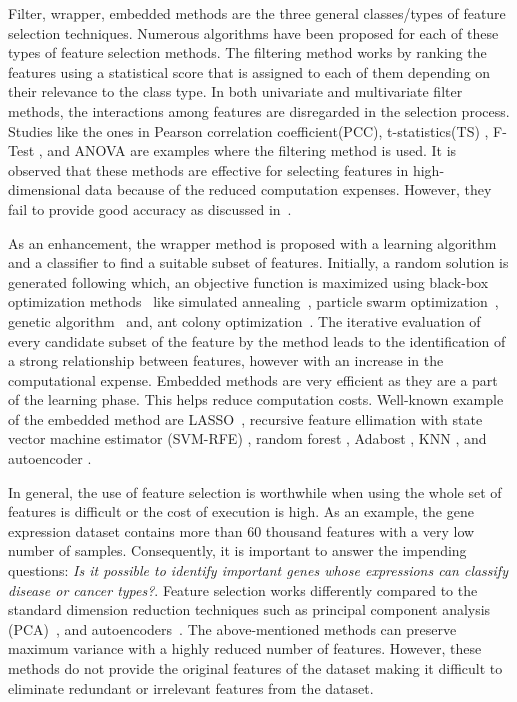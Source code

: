 \documentclass{bioinfo}
\begin{document}
Filter, wrapper, embedded methods are the three general classes/types of feature selection techniques. 
Numerous algorithms have been proposed for each of these types of feature selection methods. 
The filtering method works by ranking the features using a statistical score that is assigned to each of them depending on their relevance to the class type. 
In both univariate and multivariate filter methods, the interactions among features are disregarded in the selection process. 
Studies like the ones in Pearson correlation coefficient(PCC), t-statistics(TS) \citep{speed2003statistical}, F-Test \citep{ding2005minimum}, and ANOVA \citep{ding2015identification} are examples where the filtering method is used. 
It is observed that these methods are effective for selecting features in high-dimensional data because of the reduced computation expenses. 
However, they fail to provide good accuracy as discussed in~\citep{sun2018cross}.

 
As an enhancement, the wrapper method is proposed with a learning algorithm and a classifier to find a suitable subset of features. 
Initially, a random solution is generated following which, an objective function is maximized using black-box optimization methods~\citep{rau2019exploring} like simulated annealing~\citep{jeong2018feature}, particle swarm optimization~\citep{xue2012particle}, genetic algorithm~\citep{wu2011feature} and, ant colony optimization~\citep{kabir2012new}. 
The iterative evaluation of every candidate subset of the feature by the method leads to the identification of a strong relationship between features,  however with an increase in the computational expense. 
Embedded methods are very efficient as they are a part of the learning phase. 
This helps reduce computation costs. 
Well-known example of the embedded method are LASSO~\citep{tibshirani1996regression}, recursive feature ellimation with state vector machine estimator (SVM-RFE) \citep{abdullah2019, guyon2002gene, fang2019tightly}, random forest \citep{pouyan2018random, ram2017classification}, Adabost \citep{wang2012adaboost}, KNN \citep{le2019statistical}, and autoencoder \citep{lu2019autoencoder}.


In general, the use of feature selection is worthwhile when using the whole set of features is difficult or the cost of execution is high. 
As an example, the gene expression dataset contains more than 60 thousand features with a very low number of samples. 
Consequently, it is important to answer the impending questions: \textit{Is it possible to identify important genes whose expressions can classify disease or cancer types?}. 
Feature selection works differently compared to the standard dimension reduction techniques such as principal component analysis (PCA)~\citep{hotelling1933analysis}, and autoencoders~\citep{hinton2006reducing}. 
The above-mentioned methods can preserve maximum variance with a highly reduced number of features. 
However, these methods do not provide the original features of the dataset making it difficult to eliminate redundant or irrelevant features from the dataset. 
\end{document}
